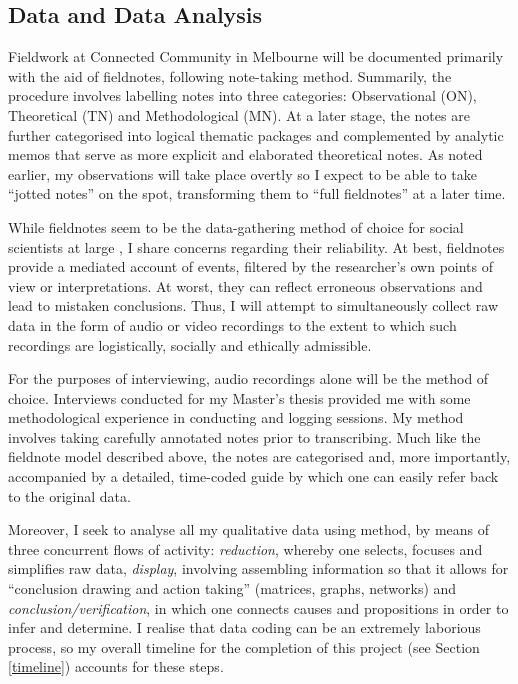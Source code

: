 \subsection{Data and Data Analysis}

Fieldwork at Connected Community in Melbourne will be documented primarily with the aid of fieldnotes, following  note-taking method. Summarily, the procedure involves labelling notes into three categories: Observational (ON), Theoretical (TN) and Methodological (MN). At a later stage, the notes are further categorised into logical thematic packages and complemented by analytic memos that serve as more explicit and elaborated theoretical notes. As noted earlier, my observations will take place overtly so I expect to be able to take ``jotted notes'' \citep[p.90]{lofland95} on the spot, transforming them to ``full fieldnotes'' at a later time. 

While fieldnotes seem to be the data-gathering method of choice for social scientists at large \citep{silverman00,lofland95,schatzman73}, I share  concerns regarding their reliability. At best, fieldnotes provide a mediated account of events, filtered by the researcher's own points of view or interpretations. At worst, they can reflect erroneous observations and lead to mistaken conclusions. Thus, I will attempt to simultaneously collect raw data in the form of audio or video recordings to the extent to which such recordings are logistically, socially and ethically admissible.

For the purposes of interviewing, audio recordings alone will be the method of choice. Interviews conducted for my Master's thesis provided me with some methodological experience in conducting and logging sessions. My method involves taking carefully annotated notes prior to transcribing. Much like the fieldnote model described above, the notes are categorised and, more importantly, accompanied by a detailed, time-coded guide by which one can easily refer back to the original data.

Moreover, I seek to analyse all my qualitative data using  method, by means of three concurrent flows of activity: \textit{reduction}, whereby one selects, focuses and simplifies raw data, \textit{display}, involving assembling information so that it allows for ``conclusion drawing and action taking'' (matrices, graphs, networks) and \textit{conclusion/verification}, in which one connects causes and propositions in order to infer and determine. I realise that data coding can be an extremely laborious process, so my overall timeline for the completion of this project (see Section \ref{timeline}) accounts for these steps.

